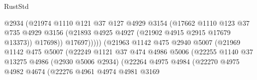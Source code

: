\begin{lexlean}{RustStd}
\begin{coremodule}
                                          @2934
                                          (@21974
                                            @1110
                                            @121
                                            @37
                                            @127
                                            @4929
                                            @3154
                                            (@17662
                                              @1110
                                              @123
                                              @37
                                              @735
                                              @4929
                                              @3156
                                              (@21893
                                                @4925
                                                @4927
                                                (@21902 @4915 @2915 @17679 @13373))
                                              @17698))
                                          @17697)))))
                                (@21963
                                  @1142
                                  @475
                                  @2940
                                  @5007
                                  (@21969
                                    @1142
                                    @475
                                    @5007
                                    (@22249
                                      @1121
                                      @37
                                      @474
                                      @4986
                                      @5006
                                      (@22255
                                        @1140
                                        @37
                                        @13275
                                        @4986
                                        (@2930 @5006 @2934)
                                        (@22264
                                          @4975
                                          @4984
                                          (@22270
                                            @4975
                                            @4982
                                            @4674
                                            (@22276
                                              @4961
                                              @4974
                                              @4981
                                              @3169

\end{coremodule}
\end{lexlean}
